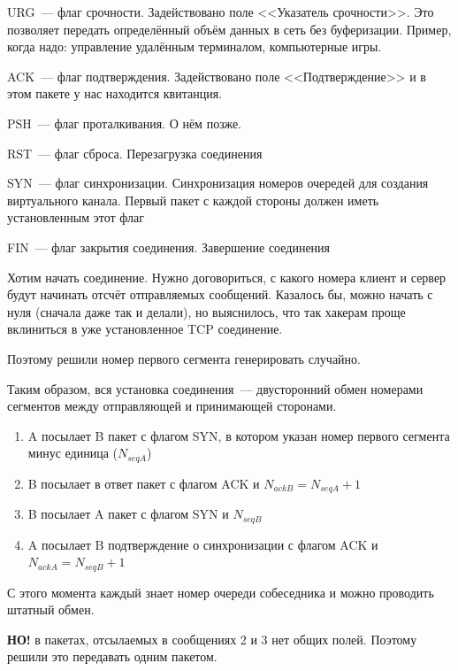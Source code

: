 \begin{MyItemize}
    \item URG~--- флаг срочности. Задействовано поле <<Указатель срочности>>. Это позволяет передать определённый объём данных в сеть без буферизации. Пример, когда надо: управление удалённым терминалом, компьютерные игры.
    \item ACK~--- флаг подтверждения. Задействовано поле <<Подтверждение>> и в этом пакете у нас находится квитанция.
    \item PSH~--- флаг проталкивания. О нём позже.
    \item RST~--- флаг сброса. Перезагрузка соединения
    \item SYN~--- флаг синхронизации. Синхронизация номеров очередей для создания виртуального канала. Первый пакет с каждой стороны должен иметь установленным этот флаг
    \item FIN~--- флаг закрытия соединения. Завершение соединения
\end{MyItemize}


Хотим начать соединение. Нужно договориться, с какого номера клиент и сервер будут начинать отсчёт отправляемых сообщений. Казалось бы, можно начать с нуля (сначала даже так и делали), но выяснилось, что так хакерам проще вклиниться в уже установленное TCP соединение.

Поэтому решили номер первого сегмента генерировать случайно. 

Таким образом, вся установка соединения~--- двусторонний обмен номерами сегментов между отправляющей и принимающей сторонами.

\begin{enumerate}
    \item A посылает B пакет с флагом SYN, в котором указан номер первого сегмента минус единица ($N_{seqA}$)
    \item B посылает в ответ пакет с флагом ACK и $N_{ackB}=N_{seqA}+1$
    \item B посылает A пакет с флагом SYN и $N_{seqB}$
    \item A посылает B подтверждение о синхронизации с флагом ACK и $N_{ackA}=N_{seqB}+1$
\end{enumerate}

С этого момента каждый знает номер очереди собеседника и можно проводить штатный обмен.

{\bf НО!} в пакетах, отсылаемых в сообщениях 2 и 3 нет общих полей. Поэтому решили это передавать одним пакетом.

